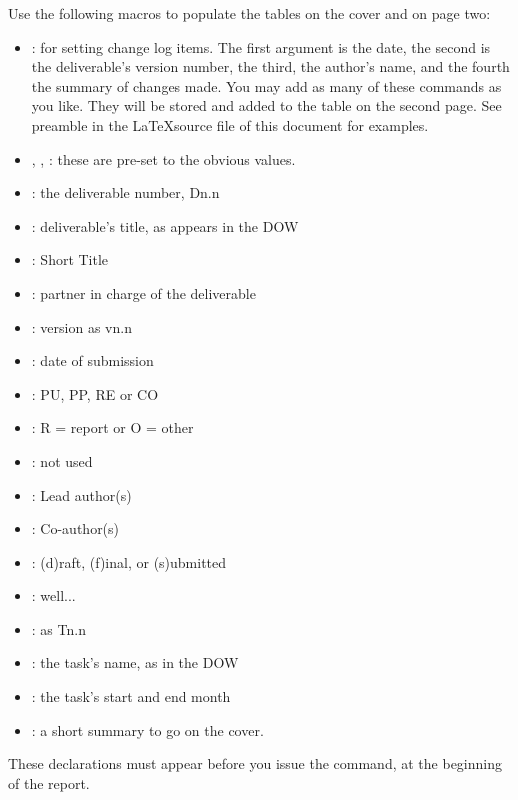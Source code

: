 \documentclass[10pt]{report}
\begin{document}
Use the following macros to populate the tables on the cover and on
page two:

\begin{itemize}[itemsep=-.5ex]
\item {}: for setting change log
  items. The first argument is the date, the second is the
  deliverable's version number, the third, the author's name, and the
  fourth the summary of changes made. You may add as many of these
  commands as you like. They will be stored and added to the table on
  the second page. See preamble in the \LaTeX source file of this
  document for examples.
\item {},
  ,
  : these are pre-set to the obvious
  values. 
\item {}: the deliverable number, Dn.n
\item {}: deliverable's title, as appears in the DOW
\item {}: Short Title
\item {}: partner in charge of the deliverable
\item {}: version as vn.n
\item {}: date of submission
\item {}: PU, PP, RE or CO
\item {}: R = report or O = other
\item {}: not used
\item {}: Lead author(s)
\item {}: Co-author(s)
\item {}: (d)raft, (f)inal, or (s)ubmitted
\item {}: well...
\item {}: as Tn.n
\item {}:  the task's name, as in the DOW
\item {}:  the task's start and end month
\item {}: a short summary to go on the cover.
\end{itemize}

These declarations must appear before you issue the 
command, at the beginning of the report.
\end{document}
